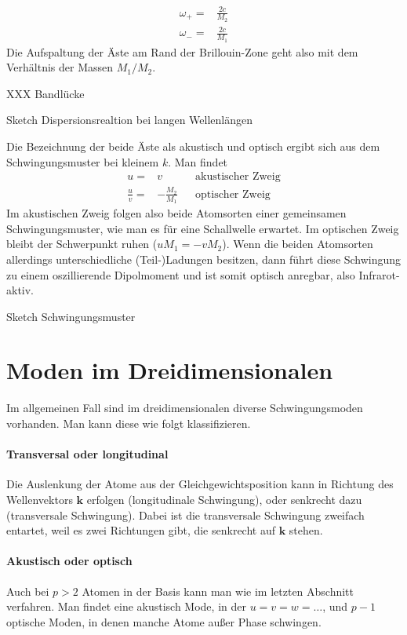 \begin{align}
\omega_+ = & \frac{2 c}{M_2} \\
\omega_- = & \frac{2 c}{M_1} 
\end{align}
Die Aufspaltung der Äste am Rand der Brillouin-Zone geht also mit dem Verhältnis der Massen $M_1 / M_2$.

XXX Bandlücke

\begin{marginfigure}
\caption{Sketch Dispersionsrealtion bei langen Wellenlängen}
\end{marginfigure}

Die Bezeichnung der beide Äste als akustisch und optisch ergibt sich aus dem Schwingungsmuster bei kleinem $k$. Man findet
\begin{align}
 u = &v &&  \text{akustischer Zweig} \\
  \frac{u}{v} = &- \frac{M_2}{M_1} &&  \text{optischer Zweig} 
\end{align}
Im akustischen Zweig folgen also beide Atomsorten einer gemeinsamen Schwingungsmuster, wie man es für eine Schallwelle erwartet. Im optischen Zweig bleibt der Schwerpunkt ruhen ($u M_1 = - v M_2$). Wenn die beiden Atomsorten allerdings unterschiedliche (Teil-)Ladungen besitzen, dann führt diese Schwingung zu einem oszillierende Dipolmoment und ist somit optisch anregbar, also Infrarot-aktiv.


\begin{marginfigure}
\caption{Sketch Schwingungsmuster}
\end{marginfigure}


\section{Moden im Dreidimensionalen}

Im allgemeinen Fall sind im dreidimensionalen diverse Schwingungsmoden vorhanden. Man kann diese wie folgt klassifizieren.

\paragraph{Transversal oder longitudinal} Die Auslenkung der Atome aus der Gleichgewichtsposition kann in Richtung des Wellenvektors $\mathbf{k}$ erfolgen (longitudinale Schwingung), oder senkrecht dazu (transversale Schwingung). Dabei ist die transversale Schwingung zweifach entartet, weil es zwei Richtungen gibt, die senkrecht auf $\mathbf{k}$ stehen.


\paragraph{Akustisch  oder optisch} Auch bei $p > 2$  Atomen in der Basis kann man wie im letzten Abschnitt verfahren. Man findet eine akustisch Mode, in der $u = v = w = \dots$, und $p -1$ optische Moden, in denen manche Atome außer Phase schwingen.

